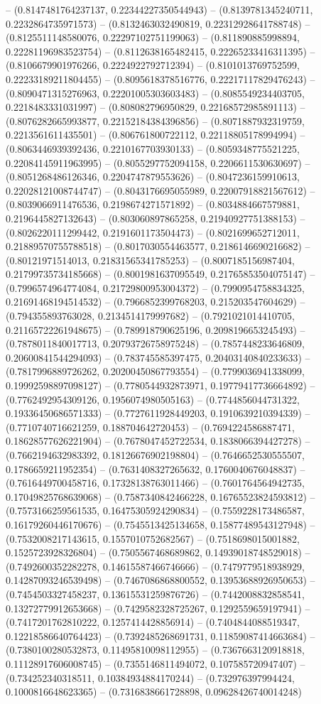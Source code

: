 -- (0.8147481764237137, 0.22344227350544943) -- (0.8139781345240711, 0.2232864735971573) -- (0.8132463032490819, 0.22312928641788748) -- (0.8125511148580076, 0.22297102751199063) -- (0.811890885998894, 0.22281196983523754) -- (0.8112638165482415, 0.22265233416311395) -- (0.8106679901976266, 0.2224922792712394) -- (0.8101013769752599, 0.22233189211804455) -- (0.8095618378516776, 0.22217117829476243) -- (0.8090471315276963, 0.22201005303603483) -- (0.8085549234403705, 0.2218483331031997) -- (0.808082796950829, 0.22168572985891113) -- (0.8076282665993877, 0.22152184384396856) -- (0.8071887932319759, 0.2213561611435501) -- (0.806761800722112, 0.22118805178994994) -- (0.8063446939392436, 0.2210167703930133) -- (0.8059348775521225, 0.22084145911963995) -- (0.8055297752094158, 0.2206611530630697) -- (0.8051268486126346, 0.2204747879553626) -- (0.8047236159910613, 0.22028121008744747) -- (0.8043176695055989, 0.22007918821567612) -- (0.8039066911476536, 0.2198674271571892) -- (0.8034884667579881, 0.2196445827132643) -- (0.803060897865258, 0.21940927751388153) -- (0.8026220111299442, 0.2191601173504473) -- (0.8021699652712011, 0.21889570755788518) -- (0.8017030554463577, 0.2186146690216682) -- (0.80121971514013, 0.21831565341785253) -- (0.8007185156987404, 0.21799735734185668) -- (0.8001981637095549, 0.21765853504075147) -- (0.7996574964774084, 0.21729800953004372) -- (0.7990954758834325, 0.21691468194514532) -- (0.7966852399768203, 0.215203547604629) -- (0.794355893763028, 0.2134514179997682) -- (0.7921021014410705, 0.21165722261948675) -- (0.789918790625196, 0.2098196653245493) -- (0.7878011840017713, 0.20793726758975248) -- (0.7857448233646809, 0.20600841544294093) -- (0.783745585397475, 0.20403140840233633) -- (0.7817996889726262, 0.20200450867793554) -- (0.7799036941338099, 0.19992598897098127) -- (0.7780544932873971, 0.19779417736664892) -- (0.7762492954309126, 0.1956074980505163) -- (0.7744856044731322, 0.19336450686571333) -- (0.7727611928449203, 0.1910639210394339) -- (0.7710740716621259, 0.188704642720453) -- (0.7694224586887471, 0.18628577626221904) -- (0.7678047452722534, 0.1838066394427278) -- (0.7662194632983392, 0.18126676902198804) -- (0.7646652530555507, 0.1786659211952354) -- (0.7631408327265632, 0.1760040676048837) -- (0.7616449700458716, 0.17328138763011466) -- (0.7601764564942735, 0.17049825768639068) -- (0.7587340842466228, 0.16765523824593812) -- (0.7573166259561535, 0.16475305924290834) -- (0.7559228173486587, 0.16179260446170676) -- (0.7545513425134658, 0.15877489543127948) -- (0.7532008217143615, 0.1557010752682567) -- (0.7518698015001882, 0.1525723928326804) -- (0.7505567468689862, 0.14939018748529018) -- (0.7492600352282278, 0.14615587466746666) -- (0.7479779518938929, 0.14287093246539498) -- (0.7467086868800552, 0.13953688926950653) -- (0.7454503327458237, 0.13615531259876726) -- (0.7442008832858541, 0.13272779912653668) -- (0.7429582328725267, 0.1292559659197941) -- (0.7417201762810222, 0.1257414428856914) -- (0.7404844088519347, 0.12218586640764423) -- (0.7392485268691731, 0.11859087414663684) -- (0.7380100280532873, 0.11495810098112955) -- (0.7367663120918818, 0.11128917606008745) -- (0.7355146811494072, 0.107585720947407) -- (0.734252340318511, 0.10384934884170244) -- (0.732976397994424, 0.1000816648623365) -- (0.7316838661728898, 0.09628426740014248) 